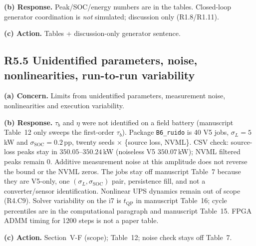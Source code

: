 \documentclass[11pt]{article}
\begin{document}
\textbf{(b) Response.} Peak/SOC/energy numbers are in the tables. Closed-loop generator coordination is \emph{not} simulated; discussion only (R1.8/R1.11).

\textbf{(c) Action.} Tables + discussion-only generator sentence.

\subsection*{R5.5 Unidentified parameters, noise, nonlinearities, run-to-run variability}
\textbf{(a) Concern.} Limits from unidentified parameters, measurement noise, nonlinearities and execution variability.

\textbf{(b) Response.} $\tau_b$ and $\eta$ were not identified on a field battery (manuscript Table~12 only sweeps the first-order $\tau_b$). Package \texttt{B6\_ruido} is 40 V5 jobs, $\sigma_L{=}5$\,kW and $\sigma_{\mathrm{SOC}}{=}0.2$\,pp, twenty seeds $\times$ \{source loss, NVML\}. CSV check: source-loss peaks stay in $350.05$--$350.24$\,kW (noiseless V5 $350.07$\,kW); NVML filtered peaks remain 0. Additive measurement noise at this amplitude does not reverse the bound or the NVML zeros. The jobs stay off manuscript Table~7 because they are V5-only, one $(\sigma_L,\sigma_{\mathrm{SOC}})$ pair, persistence fill, and not a converter/sensor identification. Nonlinear UPS dynamics remain out of scope (R4.C9). Solver variability on the i7 is $t_{\mathrm{QP}}$ in manuscript Table~16; cycle percentiles are in the computational paragraph and manuscript Table~15. FPGA ADMM timing for 1200 steps is not a paper table.

\textbf{(c) Action.} Section~V-F (scope); Table~12; noise check stays off Table~7.
\end{document}
